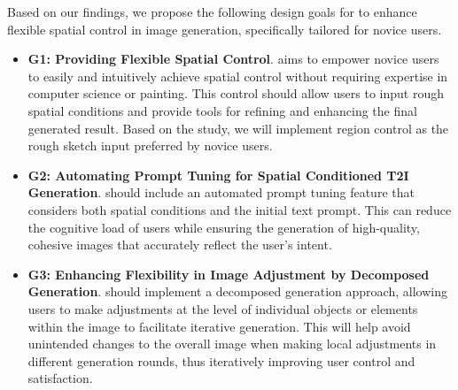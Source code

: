 Based on our findings, we propose the following design goals for \tool to enhance flexible spatial control in image generation, specifically tailored for novice users.
\begin{itemize}
    \item \textbf{G1: Providing Flexible Spatial Control}.
    \tool aims to empower novice users to easily and intuitively achieve spatial control without requiring expertise in computer science or painting. 
    This control should allow users to input rough spatial conditions and provide tools for refining and enhancing the final generated result. Based on the study, we will implement region control as the rough sketch input preferred by novice users.
    \item \textbf{G2: Automating Prompt Tuning for Spatial Conditioned T2I Generation}.
    \tool should include an automated prompt tuning feature that considers both spatial conditions and the initial text prompt. 
     This can reduce the cognitive load of users while ensuring the generation of high-quality, cohesive images that accurately reflect the user's intent.
    \item \textbf{G3: Enhancing Flexibility in Image Adjustment by Decomposed Generation}.
    \tool should implement a decomposed generation approach, allowing users to make adjustments at the level of individual objects or elements within the image to facilitate iterative generation. 
    This will help avoid unintended changes to the overall image when making local adjustments in different generation rounds, thus iteratively improving user control and satisfaction.
\end{itemize}

